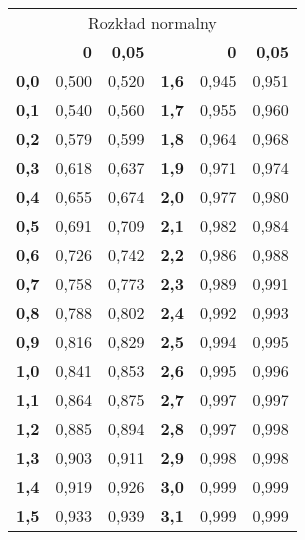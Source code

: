 \documentclass[twoside]{mwart}
\begin{document}
\begin{enumerate}
{\small
\begin{tabular}{|r|r|r||r|r|r|}
\hline
\multicolumn{6}{|c|}{Rozkład normalny} \\
	& \textbf{0}	& \textbf{0,05}	& 	& \textbf{0}	& \textbf{0,05}\\
\hline
\textbf{0,0}	& 0,500	& 0,520	& \textbf{1,6}	& 0,945	& 0,951 \\
\hline
\textbf{0,1}	& 0,540	& 0,560	& \textbf{1,7}	& 0,955	& 0,960 \\
\hline
\textbf{0,2}	& 0,579	& 0,599	& \textbf{1,8}	& 0,964	& 0,968 \\
\hline
\textbf{0,3}	& 0,618	& 0,637	& \textbf{1,9}	& 0,971	& 0,974 \\
\hline
\textbf{0,4}	& 0,655	& 0,674	& \textbf{2,0}	& 0,977	& 0,980 \\
\hline
\textbf{0,5}	& 0,691	& 0,709	& \textbf{2,1}	& 0,982	& 0,984 \\
\hline
\textbf{0,6}	& 0,726	& 0,742	& \textbf{2,2}	& 0,986	& 0,988 \\
\hline
\textbf{0,7}	& 0,758	& 0,773	& \textbf{2,3}	& 0,989	& 0,991 \\
\hline
\textbf{0,8}	& 0,788	& 0,802	& \textbf{2,4}	& 0,992	& 0,993 \\
\hline
\textbf{0,9}	& 0,816	& 0,829	& \textbf{2,5}	& 0,994	& 0,995 \\
\hline
\textbf{1,0}	& 0,841	& 0,853	& \textbf{2,6}	& 0,995	& 0,996 \\
\hline
\textbf{1,1}	& 0,864	& 0,875	& \textbf{2,7}	& 0,997	& 0,997 \\
\hline
\textbf{1,2}	& 0,885	& 0,894	& \textbf{2,8}	& 0,997	& 0,998 \\
\hline
\textbf{1,3}	& 0,903	& 0,911	& \textbf{2,9}	& 0,998	& 0,998 \\
\hline
\textbf{1,4}	& 0,919	& 0,926	& \textbf{3,0}	& 0,999	& 0,999 \\
\hline
\textbf{1,5}	& 0,933	& 0,939	& \textbf{3,1}	& 0,999	& 0,999 \\
\hline
\end{tabular}
}
\end{enumerate}

\clearpage
\end{document}
